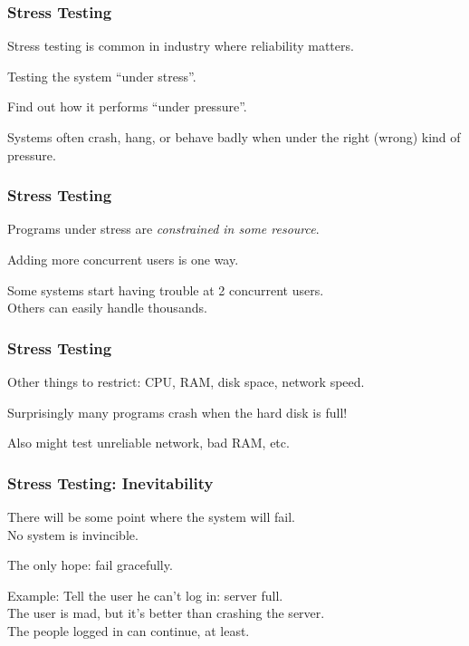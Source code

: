 \begin{frame}
\frametitle{Stress Testing}

\begin{changemargin}{1cm}
Stress testing is common in industry where reliability matters.

Testing the system ``under stress''.

Find out how it performs ``under pressure''.

Systems often crash, hang, or behave badly when under the right (wrong) kind of pressure.

\end{changemargin}
\end{frame}

\begin{frame}
\frametitle{Stress Testing}

\begin{changemargin}{1cm}
Programs under stress are \textit{constrained in some resource}.

Adding more concurrent users is one way.

Some systems start having trouble at 2 concurrent users.\\
\quad Others can easily handle thousands.

\end{changemargin}
\end{frame}

\begin{frame}
\frametitle{Stress Testing}

\begin{changemargin}{1cm}
Other things to restrict: CPU, RAM, disk space, network speed.

Surprisingly many programs crash when the hard disk is full!

Also might test unreliable network, bad RAM, etc.

\end{changemargin}
\end{frame}

\begin{frame}
\frametitle{Stress Testing: Inevitability}

\begin{changemargin}{1cm}
There will be some point where the system will fail.\\
\quad No system is invincible.

The only hope: fail gracefully.

Example: Tell the user he can't log in: server full.\\
\quad The user is mad, but it's better than crashing the server.\\
\quad The people logged in can continue, at least.


\end{changemargin}
\end{frame}


